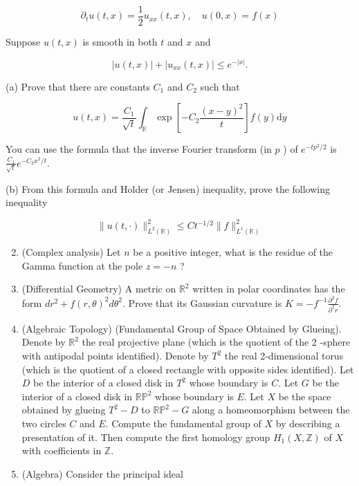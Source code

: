 \documentclass[10pt]{article}
\begin{document}
$$
\partial_{t} u(t, x)=\frac{1}{2} u_{x x}(t, x), \quad u(0, x)=f(x)
$$

Suppose $u(t, x)$ is smooth in both $t$ and $x$ and

$$
|u(t, x)|+\left|u_{x x}(t, x)\right| \leq e^{-|x|} .
$$

(a) Prove that there are constants $C_{1}$ and $C_{2}$ such that

$$
u(t, x)=\frac{C_{1}}{\sqrt{t}} \int_{\mathbb{R}} \exp \left[-C_{2} \frac{(x-y)^{2}}{t}\right] f(y) \mathrm{d} y
$$

You can use the formula that the inverse Fourier transform (in $p$ ) of $e^{-t p^{2} / 2}$ is $\frac{C_{1}}{\sqrt{t}} e^{-C_{2} x^{2} / t}$.

(b) From this formula and Holder (or Jensen) inequality, prove the following inequality

$$
\|u(t, \cdot)\|_{L^{2}(\mathbb{R})}^{2} \leq C t^{-1 / 2}\|f\|_{L^{1}(\mathbb{R})}^{2}
$$

\begin{enumerate}
  \setcounter{enumi}{1}
  \item (Complex analysis) Let $n$ be a positive integer, what is the residue of the Gamma function at the pole $z=-n$ ?

  \item (Differential Geometry) A metric on $\mathbb{R}^{2}$ written in polar coordinates has the form $d r^{2}+f(r, \theta)^{2} d \theta^{2}$. Prove that its Gaussian curvature is $K=-f^{-1} \frac{\partial^{2} f}{\partial^{2} r}$.

  \item (Algebraic Topology) (Fundamental Group of Space Obtained by Glueing). Denote by $\mathbb{R}^{2}$ the real projective plane (which is the quotient of the 2 -sphere with antipodal points identified). Denote by $T^{2}$ the real 2-dimensional torus (which is the quotient of a closed rectangle with opposite sides identified). Let $D$ be the interior of a closed disk in $T^{2}$ whose boundary is $C$. Let $G$ be the interior of a closed disk in $\mathbb{R P}^{2}$ whose boundary is $E$. Let $X$ be the space obtained by glueing $T^{2}-D$ to $\mathbb{R P}^{2}-G$ along a homeomorphism between the two circles $C$ and $E$. Compute the fundamental group of $X$ by describing a presentation of it. Then compute the first homology group $H_{1}(X, \mathbb{Z})$ of $X$ with coefficients in $\mathbb{Z}$.

  \item (Algebra) Consider the principal ideal

\end{enumerate}
\end{document}
